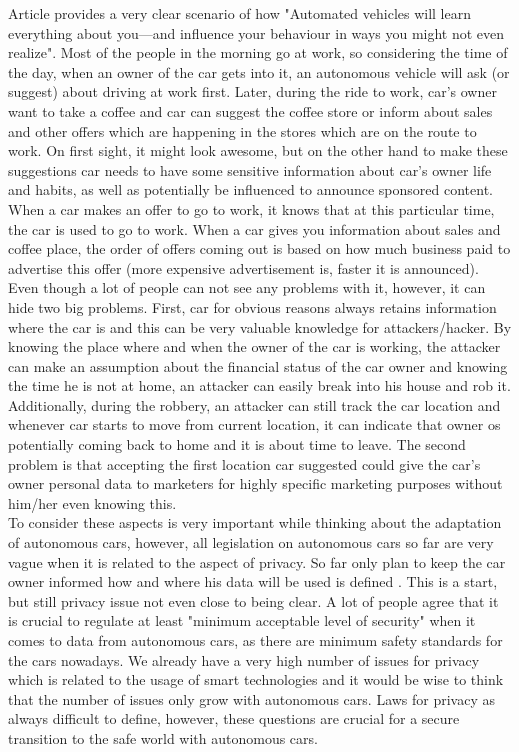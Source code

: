 Article \cite{ThreatenPrivacy} provides a very clear scenario of how "Automated vehicles will learn everything about you—and influence your behaviour in ways you might not even realize". Most of the people in the morning go at work, so considering the time of the day, when an owner of the car gets into it, an autonomous vehicle will ask (or suggest) about driving at work first. Later, during the ride to work, car's owner want to take a coffee and car can suggest the coffee store or inform about sales and other offers which are happening in the stores which are on the route to work. On first sight, it might look awesome, but on the other hand to make these suggestions car needs to have some sensitive information about car's owner life and habits, as well as potentially be influenced to announce sponsored content. When a car makes an offer to go to work, it knows that at this particular time, the car is used to go to work. When a car gives you information about sales and coffee place, the order of offers coming out is based on how much business paid to advertise this offer (more expensive advertisement is, faster it is announced). Even though a lot of people can not see any problems with it, however, it can hide two big problems. First, car for obvious reasons always retains information where the car is and this can be very valuable knowledge for attackers/hacker. By knowing the place where and when the owner of the car is working, the attacker can make an assumption about the financial status of the car owner and knowing the time he is not at home, an attacker can easily break into his house and rob it. Additionally, during the robbery, an attacker can still track the car location and whenever car starts to move from current location, it can indicate that owner os potentially coming back to home and it is about time to leave. The second problem is that accepting the first location car suggested could give the car's owner personal data to marketers for highly specific marketing purposes without him/her even knowing this. \\
To consider these aspects is very important while thinking about the adaptation of autonomous cars, however, all legislation on autonomous cars so far are very vague when it is related to the aspect of privacy. So far only plan to keep the car owner informed how and where his data will be used is defined \cite{ThreatenPrivacyII}. This is a start, but still privacy issue not even close to being clear. A lot of people agree that it is crucial to regulate at least "minimum acceptable level of security" when it comes to data from autonomous cars, as there are minimum safety standards for the cars nowadays. We already have a very high number of issues for privacy which is related to the usage of smart technologies and it would be wise to think that the number of issues only grow with autonomous cars. Laws for privacy as always difficult to define, however, these questions are crucial for a secure transition to the safe world with autonomous cars. \\
